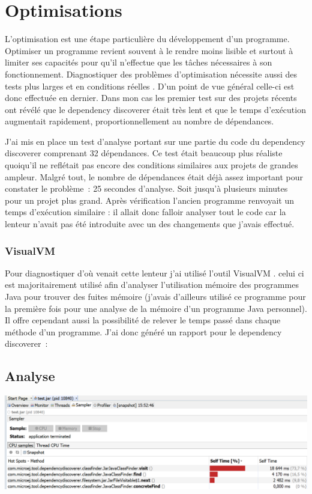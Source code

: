 \documentclass[french,a4paper,12pt]{report}
\begin{document}
\section{Optimisations}
L’optimisation est une étape particulière du développement d’un programme. Optimiser un programme revient souvent à le rendre moins lisible et surtout à limiter ses capacités pour qu’il n’effectue que les tâches nécessaires à son fonctionnement. Diagnostiquer des problèmes d’optimisation nécessite aussi des tests plus larges et en conditions réelles . D’un point de vue général celle-ci est donc effectuée en dernier. 
Dans mon cas les premier test sur des projets récents ont révélé que le dependency discoverer était très lent et que le temps d’exécution augmentait rapidement, proportionnellement au nombre de dépendances. 

J’ai mis en place un test d’analyse portant sur une partie du code du dependency discoverer comprenant 32 dépendances. Ce test était beaucoup plus réaliste quoiqu'il ne reflétait pas encore des conditions similaires aux projets de grandes ampleur. Malgré tout, le nombre de dépendances était déjà assez important pour constater le problème : 25 secondes d’analyse. Soit jusqu’à plusieurs minutes pour un projet plus grand. Après vérification l’ancien programme renvoyait un temps d’exécution similaire : il allait donc falloir analyser tout le code car la lenteur n'avait pas été introduite avec un des changements que j'avais effectué. 

\subsubsection{VisualVM}

Pour diagnostiquer d’où venait cette lenteur j’ai utilisé l’outil VisualVM . celui ci est majoritairement utilisé afin d’analyser l’utilisation mémoire des programmes Java pour trouver des fuites mémoire (j’avais d’ailleurs utilisé ce programme pour la première fois pour une analyse de la mémoire d’un programme Java personnel). Il offre cependant aussi la possibilité de relever le temps passé dans chaque méthode d’un programme. J’ai donc généré un rapport pour le dependency discoverer :


\subsection{Analyse}

\begin{center}
\includegraphics[width=\textwidth]{./ressources/images/timeRepartitionByMethodssheer.png}
\end{center}
\end{document}
